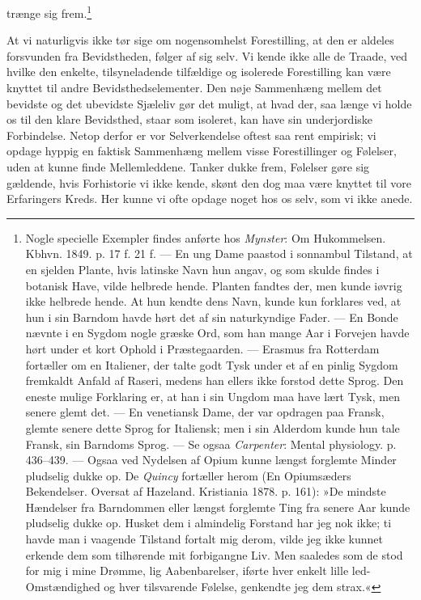 \documentclass[12pt,a4paper,openany]{book}
\newcommand{\opage}[1]{\marginnote{\footnotesize\textit{[#1]}}}
\begin{document}
trænge sig frem.\footnote[1]{Nogle specielle Exempler findes anførte hos
\emph{Mynster}: Om Hukommelsen. Kbhvn. 1849. p. 17 f. 21 f. --- En ung
Dame paastod i sonnambul Tilstand, at en sjelden Plante, hvis latinske
Navn hun angav, og som skulde findes i botanisk Have, vilde helbrede
hende. Planten fandtes der, men kunde iøvrig ikke helbrede hende. At hun
kendte dens Navn, kunde kun forklares ved, at hun i sin Barndom havde
hørt det af sin naturkyndige Fader. --- En Bonde nævnte i en Sygdom
nogle græske Ord, som han mange Aar i Forvejen havde hørt under et kort
Ophold i Præstegaarden. --- Erasmus fra Rotterdam fortæller om en
Italiener, der talte godt Tysk under et af en pinlig Sygdom fremkaldt
Anfald af Raseri, medens han ellers ikke forstod dette Sprog. Den eneste
mulige Forklaring er, at han i sin Ungdom maa have lært Tysk, men senere
glemt det. --- En venetiansk Dame, der var opdragen paa Fransk, glemte
senere dette Sprog for Italiensk; men i sin Alderdom kunde hun tale
Fransk, sin Barndoms Sprog. --- Se ogsaa \emph{Carpenter}: Mental
physiology. p. 436--439. --- Ogsaa ved Nydelsen af Opium kunne længst
forglemte Minder pludselig dukke op. De \emph{Quincy} fortæller herom
(En Opiumsæders Bekendelser. Oversat af Hazeland. Kristiania 1878. p.
161): »De mindste Hændelser fra Barndommen eller længst forglemte Ting
fra senere Aar kunde pludselig dukke op. Husket dem i almindelig
Forstand har jeg nok ikke; ti havde man i vaagende Tilstand fortalt mig
derom, vilde jeg ikke kunnet erkende dem som tilhørende mit forbigangne
Liv. Men saaledes som de stod for mig i mine Drømme, lig Aabenbarelser,
iførte hver enkelt lille led-Omstændighed og hver tilsvarende Følelse,
genkendte jeg dem strax.«}

At vi naturligvis ikke tør sige om nogensomhelst Forestilling, at den er
aldeles forsvunden fra Bevidstheden, følger af sig selv. Vi kende ikke
alle de Traade, ved hvilke den enkelte, tilsyneladende tilfældige og
isolerede Forestilling kan
\opage{175}være knyttet til andre Bevidsthedselementer. Den nøje
Sammenhæng mellem det bevidste og det ubevidste Sjæleliv gør det muligt,
at hvad der, saa længe vi holde os til den klare Bevidsthed, staar som
isoleret, kan have sin underjordiske Forbindelse. Netop derfor er vor
Selverkendelse oftest saa rent empirisk; vi opdage hyppig en faktisk
Sammenhæng mellem visse Forestillinger og Følelser, uden at kunne finde
Mellemleddene. Tanker dukke frem, Følelser gøre sig gældende, hvis
Forhistorie vi ikke kende, skønt den dog maa være knyttet til vore
Erfaringers Kreds. Her kunne vi ofte opdage noget hos os selv, som vi
ikke anede.
\end{document}
